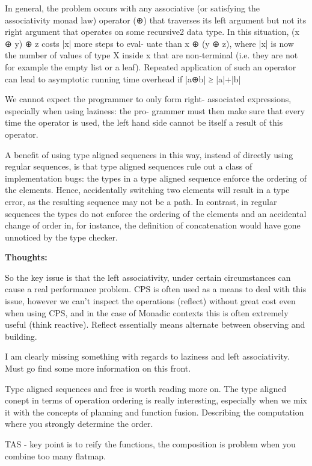 \documentclass{article}
\begin{document}
In general, the problem occurs with any associative (or satisfying the associativity monad law) operator (⊕) that traverses its left argument but not its right argument that operates on some recursive2 data type. In this situation, (x ⊕ y) ⊕ z costs |x| more steps to eval- uate than x ⊕ (y ⊕ z), where |x| is now the number of values of type X inside x that are non-terminal (i.e. they are not for example the empty list or a leaf). Repeated application of such an operator can lead to asymptotic running time overhead if |a⊕b| ≥ |a|+|b|

We cannot expect the programmer to only form right- associated expressions, especially when using laziness: the pro- grammer must then make sure that every time the operator is used, the left hand side cannot be itself a result of this operator.

A benefit of using type aligned sequences in this way, instead of directly using regular sequences, is that type aligned sequences rule out a class of implementation bugs: the types in a type aligned sequence enforce the ordering of the elements. Hence, accidentally switching two elements will result in a type error, as the resulting sequence may not be a path. In contrast, in regular sequences the types do not enforce the ordering of the elements and an accidental change of order in, for instance, the definition of concatenation would have gone unnoticed by the type checker.

\textbf{Thoughts:}

So the key issue is that the left associativity, under certain circumstances can cause a real performance problem. CPS is often used as a means to deal with this issue, however we can't inspect the operations (reflect) without great cost even when using CPS, and in the case of Monadic contexts this is often extremely useful (think reactive). Reflect essentially means alternate between observing and building.

I am clearly missing something with regards to laziness and left associativity. Must go find some more information on this front. 

Type aligned sequences and free is worth reading more on. The type aligned conept in terms of operation ordering is really interesting, especially when we mix it with the concepts of planning and function fusion. Describing the computation where you strongly determine the order.

TAS - key point is to reify the functions, the composition is problem when you combine too many flatmap.
\end{document}
